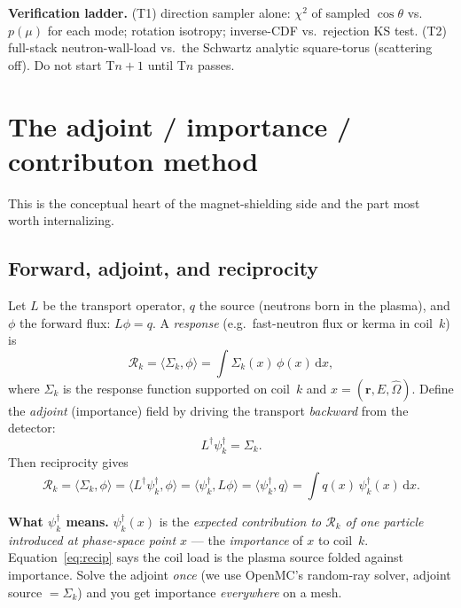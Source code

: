 \documentclass[11pt]{article}
\newcommand{\psid}{\psi^{\dagger}}
\newcommand{\dd}{\,\mathrm{d}}
\newcommand{\R}{\mathcal{R}}
\begin{document}
\begin{key}
\textbf{Verification ladder.} (T1) direction sampler alone: $\chi^2$ of sampled $\cos\theta$ vs.\
$p(\mu)$ for each mode; rotation isotropy; inverse-CDF vs.\ rejection KS test. (T2) full-stack
neutron-wall-load vs.\ the Schwartz analytic square-torus (scattering off). Do not start T$n{+}1$
until T$n$ passes.
\end{key}

\section{The adjoint / importance / contributon method}
\label{sec:adjoint}

This is the conceptual heart of the magnet-shielding side and the part most worth internalizing.

\subsection{Forward, adjoint, and reciprocity}
Let $L$ be the transport operator, $q$ the source (neutrons born in the plasma), and $\phi$ the
forward flux: $L\phi=q$. A \emph{response} (e.g.\ fast-neutron flux or kerma in coil~$k$) is
\begin{equation}
\R_k = \langle \Sigma_k,\phi\rangle = \int \Sigma_k(x)\,\phi(x)\dd x ,
\end{equation}
where $\Sigma_k$ is the response function supported on coil~$k$ and $x=(\mathbf r,E,\hat\Omega)$.
Define the \emph{adjoint} (importance) field by driving the transport \emph{backward} from the
detector:
\begin{equation}
L^\dagger \psid_k = \Sigma_k .
\end{equation}
Then reciprocity gives
\begin{equation}
\boxed{\;\R_k = \langle \Sigma_k,\phi\rangle = \langle L^\dagger\psid_k,\phi\rangle
 = \langle \psid_k, L\phi\rangle = \langle \psid_k, q\rangle = \int q(x)\,\psid_k(x)\dd x.\;}
\label{eq:recip}
\end{equation}

\begin{key}
\textbf{What $\psid_k$ means.} $\psid_k(x)$ is the \emph{expected contribution to $\R_k$ of one
particle introduced at phase-space point $x$} --- the \emph{importance} of $x$ to coil~$k$.
Equation~\eqref{eq:recip} says the coil load is the plasma source folded against importance. Solve
the adjoint \emph{once} (we use OpenMC's random-ray solver, adjoint source $=\Sigma_k$) and you
get importance \emph{everywhere} on a mesh.
\end{key}
\end{document}
